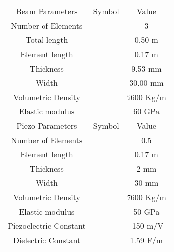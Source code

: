 \documentclass{ifacconf}
\begin{document}
\begin{table}[h!]
\caption{}
\begin{center}
\label{tab:parameters}
\begin{tabular}{c c c}
& & \\ \hline
\hline
Beam Parameters & Symbol & Value\\
\hline
Number of Elements &  & 3 \\
Total length &  & 0.50 m\\
Element length &  & 0.17 m\\
Thickness &  & 9.53 mm \\
Width &  & 30.00 mm \\
Volumetric Density &  & 2600 Kg/m \\
Elastic modulus &  & 60 GPa \\
\hline
\hline
Piezo Parameters & Symbol & Value\\
\hline
Number of Elements &  & 0.5 \\
Element length &  & 0.17 m\\
Thickness &  & 2 mm \\
Width &  & 30 mm \\
Volumetric Density &  & 7600 Kg/m \\
Elastic modulus &  & 50 GPa \\
Piezoelectric Constant &  & -150 m/V \\
Dielectric Constant &  & 1.59 F/m \\
\hline
\hline
\end{tabular}
\end{center}
\end{table}       
                                                
\end{document}
